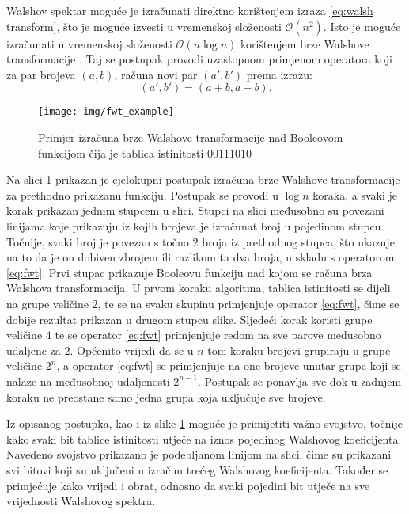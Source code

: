 Walshov spektar moguće je izračunati direktno korištenjem izraza \eqref{eq:walsh transform}, što je moguće izvesti u vremenskoj složenosti $\mathcal{O}(n^2)$.
Isto je moguće izračunati u vremenskoj složenosti $\mathcal{O}(n\log n)$ korištenjem brze Walshove transformacije .
Taj se postupak provodi uzastopnom primjenom operatora koji za par brojeva $(a, b)$, računa novi par $(a', b')$ prema izrazu:
\begin{equation}\label{eq:fwt}
    (a', b') = (a+b, a-b).
\end{equation}
\begin{figure}[ht!] 
    \centering
    \texttt{[image: img/fwt\_example]}
    \captionsetup{justification=centering}
    \caption{Primjer izračuna brze Walshove transformacije nad Booleovom funkcijom čija je tablica istinitosti $00111010$}
    \label{fig:fwt_example}
\end{figure}
Na slici \ref{fig:fwt_example} prikazan je cjelokupni postupak izračuna brze Walshove transformacije za prethodno prikazanu funkciju.
Postupak se provodi u $\log n$ koraka, a svaki je korak prikazan jednim stupcem u slici.
Stupci na slici međusobno su povezani linijama koje prikazuju iz kojih brojeva je izračunat broj u pojedinom stupcu.
Točnije, svaki broj je povezan s točno $2$ broja iz prethodnog stupca, što ukazuje na to da je on dobiven zbrojem ili razlikom ta dva broja, u skladu s operatorom \eqref{eq:fwt}.
Prvi stupac prikazuje Booleovu funkciju nad kojom se računa brza Walshova transformacija.
U prvom koraku algoritma, tablica istinitosti se dijeli na grupe veličine $2$, te se na svaku skupinu primjenjuje operator \eqref{eq:fwt}, čime se dobije rezultat prikazan u drugom stupcu slike.
Sljedeći korak koristi grupe veličine $4$ te se operator \eqref{eq:fwt} primjenjuje redom na sve parove međusobno udaljene za $2$.
Općenito vrijedi da se u $n$-tom koraku brojevi grupiraju u grupe veličine $2^n$, a operator \eqref{eq:fwt} se primjenjuje na one brojeve unutar grupe koji se nalaze na međusobnoj udaljenosti $2^{n-1}$.
Postupak se ponavlja sve dok u zadnjem koraku ne preostane samo jedna grupa koja uključuje sve brojeve.

Iz opisanog postupka, kao i iz slike \ref{fig:fwt_example} moguće je primijetiti važno svojstvo, točnije kako svaki bit tablice istinitosti utječe na iznos pojedinog Walshovog koeficijenta. 
Navedeno svojstvo prikazano je podebljanom linijom na slici, čime su prikazani svi bitovi koji su uključeni u izračun trećeg Walshovog koeficijenta.
Također se primjećuje kako vrijedi i obrat, odnosno da svaki pojedini bit utječe na sve vrijednosti Walshovog spektra.

